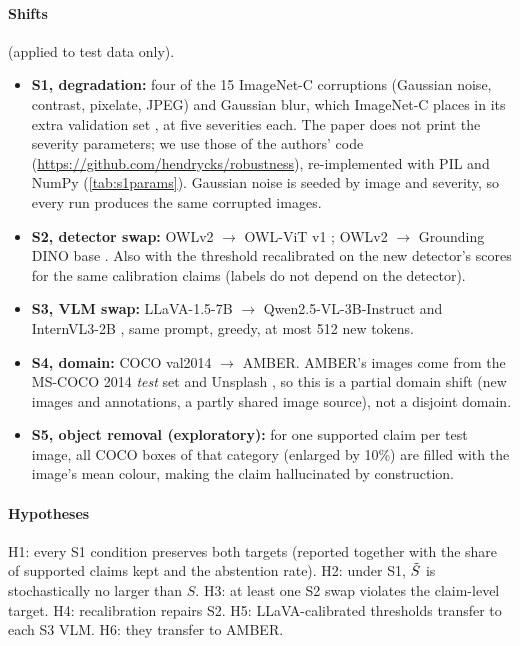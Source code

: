 \paragraph{Shifts} (applied to test data only).
\begin{itemize}[leftmargin=*,itemsep=1pt]
  \item \textbf{S1, degradation:} four of the 15 ImageNet-C corruptions (Gaussian noise, contrast, pixelate, JPEG) and Gaussian blur, which ImageNet-C places in its extra validation set \citep[Sec.~4.1 and App.~B]{hendrycks2019benchmarking}, at five severities each. The paper does not print the severity parameters; we use those of the authors' code (\url{https://github.com/hendrycks/robustness}), re-implemented with PIL and NumPy (\cref{tab:s1params}). Gaussian noise is seeded by image and severity, so every run produces the same corrupted images.
  \item \textbf{S2, detector swap:} OWLv2 $\to$ OWL-ViT v1 \citep{minderer2022simple}; OWLv2 $\to$ Grounding DINO base \citep{liu2024grounding}. Also with the threshold recalibrated on the new detector's scores for the same calibration claims (labels do not depend on the detector).
  \item \textbf{S3, VLM swap:} LLaVA-1.5-7B $\to$ Qwen2.5-VL-3B-Instruct \citep{bai2025qwen25} and InternVL3-2B \citep{zhu2025internvl3}, same prompt, greedy, at most 512 new tokens.
  \item \textbf{S4, domain:} COCO val2014 $\to$ AMBER. AMBER's images come from the MS-COCO 2014 \emph{test} set and Unsplash \citep[App.~A.1.1]{wang2023amber}, so this is a partial domain shift (new images and annotations, a partly shared image source), not a disjoint domain.
  \item \textbf{S5, object removal (exploratory):} for one supported claim per test image, all COCO boxes of that category (enlarged by 10\%) are filled with the image's mean colour, making the claim hallucinated by construction.
\end{itemize}

\paragraph{Hypotheses} H1: every S1 condition preserves both targets (reported together with the share of supported claims kept and the abstention rate). H2: under S1, $\tilde S$ is stochastically no larger than $S$. H3: at least one S2 swap violates the claim-level target. H4: recalibration repairs S2. H5: LLaVA-calibrated thresholds transfer to each S3 VLM. H6: they transfer to AMBER.

